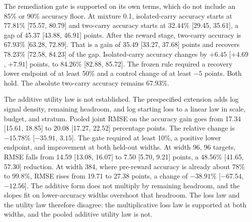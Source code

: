 The remediation gate is supported on its own terms, which do not include an 85\% or 90\% accuracy floor.
At mixture 0.1, isolated-carry accuracy starts at 77.81\% [75.57, 80.79] and two-carry accuracy starts at 32.44\% [29.45, 35.61], a gap of 45.37 [43.88, 46.91] points.
After the reward stage, two-carry accuracy is 67.93\% [63.28, 72.89].
That is a gain of 35.49 [33.27, 37.68] points and recovers 78.23\% [72.58, 84.23] of the gap.
Isolated-carry accuracy changes by $+6.45$ [$+4.69$, $+7.91$] points, to 84.26\% [82.88, 85.72].
The frozen rule required a recovery lower endpoint of at least 50\% and a control change of at least $-5$ points.
Both hold.
The absolute two-carry accuracy remains 67.93\%.

The additive utility law is not established.
The prespecified extension adds log signal density, remaining headroom, and log starting loss to a linear law in scale, budget, and stratum.
Pooled joint RMSE on the accuracy gain goes from 17.34 [15.61, 18.85] to 20.08 [17.27, 22.52] percentage points.
The relative change is $-15.78\%$ [$-35.91$, $3.15$].
The gate required at least 10\%, a positive lower endpoint, and improvement at both held-out widths.
At width 96, 96 targets, RMSE falls from 14.59 [13.08, 16.07] to 7.50 [5.70, 9.21] points, a 48.56\% [41.65, 57.30] reduction.
At width 384, where pre-reward accuracy is already about 78\% to 99.8\%, RMSE rises from 19.71 to 27.38 points, a change of $-38.91\%$ [$-67.54$, $-12.56$].
The additive form does not multiply by remaining headroom, and the slopes fit on lower-accuracy widths overshoot that headroom.
The loss law and the utility law therefore disagree: the multiplicative loss law is supported at both widths, and the pooled additive utility law is not.


